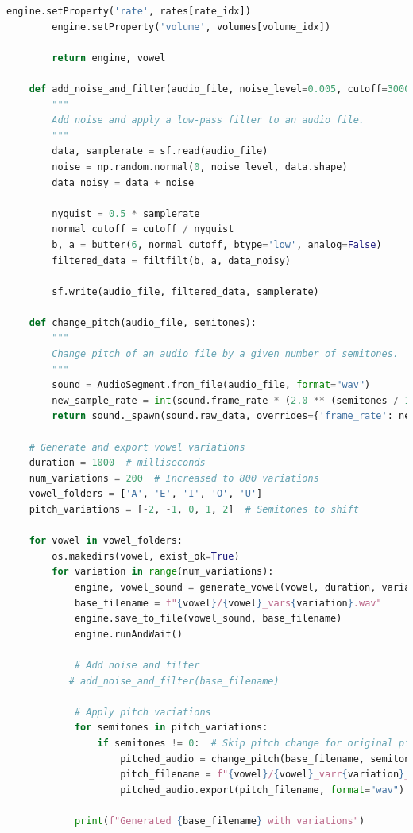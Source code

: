 \begin{lstlisting}[language=Python, caption={Audio Generation with pyttsx3}]
        engine.setProperty('rate', rates[rate_idx])
        engine.setProperty('volume', volumes[volume_idx])
        
        return engine, vowel
    
    def add_noise_and_filter(audio_file, noise_level=0.005, cutoff=3000):
        """
        Add noise and apply a low-pass filter to an audio file.
        """
        data, samplerate = sf.read(audio_file)
        noise = np.random.normal(0, noise_level, data.shape)
        data_noisy = data + noise
    
        nyquist = 0.5 * samplerate
        normal_cutoff = cutoff / nyquist
        b, a = butter(6, normal_cutoff, btype='low', analog=False)
        filtered_data = filtfilt(b, a, data_noisy)
        
        sf.write(audio_file, filtered_data, samplerate)
    
    def change_pitch(audio_file, semitones):
        """
        Change pitch of an audio file by a given number of semitones.
        """
        sound = AudioSegment.from_file(audio_file, format="wav")
        new_sample_rate = int(sound.frame_rate * (2.0 ** (semitones / 12.0)))
        return sound._spawn(sound.raw_data, overrides={'frame_rate': new_sample_rate}).set_frame_rate(44100)
    
    # Generate and export vowel variations
    duration = 1000  # milliseconds
    num_variations = 200  # Increased to 800 variations
    vowel_folders = ['A', 'E', 'I', 'O', 'U']
    pitch_variations = [-2, -1, 0, 1, 2]  # Semitones to shift
    
    for vowel in vowel_folders:
        os.makedirs(vowel, exist_ok=True)
        for variation in range(num_variations):
            engine, vowel_sound = generate_vowel(vowel, duration, variation)
            base_filename = f"{vowel}/{vowel}_vars{variation}.wav"
            engine.save_to_file(vowel_sound, base_filename)
            engine.runAndWait()
            
            # Add noise and filter
           # add_noise_and_filter(base_filename)
            
            # Apply pitch variations
            for semitones in pitch_variations:
                if semitones != 0:  # Skip pitch change for original pitch
                    pitched_audio = change_pitch(base_filename, semitones)
                    pitch_filename = f"{vowel}/{vowel}_varr{variation}_pitch{semitones}.wav"
                    pitched_audio.export(pitch_filename, format="wav")
            
            print(f"Generated {base_filename} with variations")


\end{lstlisting}


